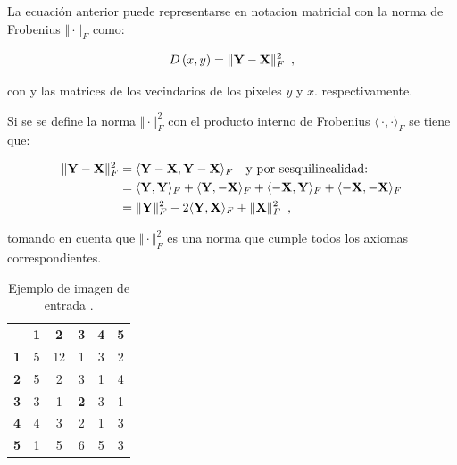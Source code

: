 La ecuación anterior puede representarse en notacion matricial con la norma de Frobenius $\Vert \cdot \Vert_{F}$ como:


\begin{equation}
D\left(x,y\right)=\Vert \mathbf{Y} - \mathbf{X} \Vert_{F}^2 \enspace ,
\label{eq:distMat}
\end{equation}

con  y  las matrices de los vecindarios de los pixeles $y$ y $x$. respectivamente.

Si se se define la norma $\Vert \cdot \Vert_{F}^2$ con el producto interno de Frobenius $\langle\,\cdot,\cdot\rangle_{F}$ se tiene que:

\begin{equation}\label{eq:frobProd}
\begin{split}
\Vert \mathbf{Y} - \mathbf{X} \Vert_{F}^2 & = \langle\mathbf{Y} - \mathbf{X},\mathbf{Y} - \mathbf{X}\rangle_{F}  \quad \text{y por sesquilinealidad:}\\ 
& = \langle\mathbf{Y},\mathbf{Y}\rangle_{F} + \langle\mathbf{Y},-\mathbf{X}\rangle_{F} + \langle-\mathbf{X},\mathbf{Y}\rangle_{F} + \langle-\mathbf{X},-\mathbf{X}\rangle_{F}\\
& = \Vert \mathbf{Y} \Vert_{F}^2 -2\langle\mathbf{Y},\mathbf{X}\rangle_{F} + \Vert \mathbf{X} \Vert_{F}^2 \enspace ,
\end{split} 
\end{equation}


tomando en cuenta que $\Vert \cdot \Vert_{F}^2$ es una norma que cumple todos los axiomas correspondientes. 

\begin{table}
\begin{center}
\caption{Ejemplo de imagen de entrada .\label{table:imageExample}}

\renewcommand{\arraystretch}{1.4}
\setlength\tabcolsep{3pt}

{
\begin{tabular}{cc|ccc|c}
 & \multicolumn{1}{c}{\textbf{1}} & \textbf{2} & \textbf{3} & \multicolumn{1}{c}{\textbf{4}} & \textbf{5}\tabularnewline
\textbf{1} & \multicolumn{1}{c}{5} & 12 & 1 & \multicolumn{1}{c}{3} & 2\tabularnewline
\cline{3-5} 
\textbf{2} & 5 & 2 & 3 & 1 & 4\tabularnewline
\textbf{3} & 3 & 1 & \textbf{2} & 3 & 1\tabularnewline
\textbf{4} & 4 & 3 & 2 & 1 & 3\tabularnewline
\cline{3-5} 
\textbf{5} & \multicolumn{1}{c}{1} & 5 & 6 & \multicolumn{1}{c}{5} & 3\tabularnewline
\end{tabular}
}
\par\end{center} 
\end{table}

